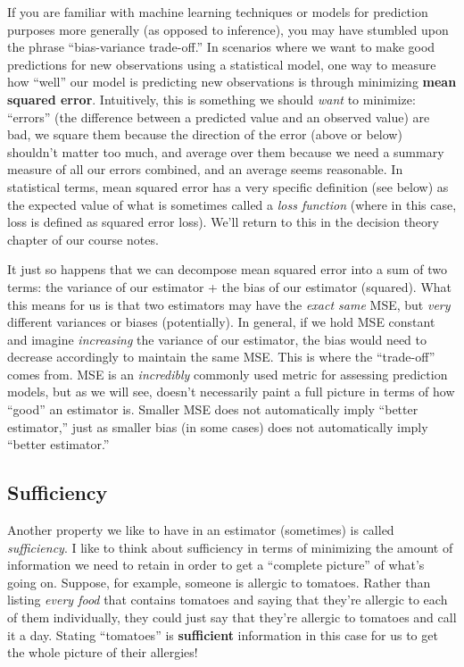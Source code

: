 \documentclass[
  letterpaper,
  DIV=11,
  numbers=noendperiod]{scrreprt}
\begin{document}
If you are familiar with machine learning techniques or models for
prediction purposes more generally (as opposed to inference), you may
have stumbled upon the phrase ``bias-variance trade-off.'' In scenarios
where we want to make good predictions for new observations using a
statistical model, one way to measure how ``well'' our model is
predicting new observations is through minimizing \textbf{mean squared
error}. Intuitively, this is something we should \emph{want} to
minimize: ``errors'' (the difference between a predicted value and an
observed value) are bad, we square them because the direction of the
error (above or below) shouldn't matter too much, and average over them
because we need a summary measure of all our errors combined, and an
average seems reasonable. In statistical terms, mean squared error has a
very specific definition (see below) as the expected value of what is
sometimes called a \emph{loss function} (where in this case, loss is
defined as squared error loss). We'll return to this in the decision
theory chapter of our course notes.

It just so happens that we can decompose mean squared error into a sum
of two terms: the variance of our estimator + the bias of our estimator
(squared). What this means for us is that two estimators may have the
\emph{exact same} MSE, but \emph{very} different variances or biases
(potentially). In general, if we hold MSE constant and imagine
\emph{increasing} the variance of our estimator, the bias would need to
decrease accordingly to maintain the same MSE. This is where the
``trade-off'' comes from. MSE is an \emph{incredibly} commonly used
metric for assessing prediction models, but as we will see, doesn't
necessarily paint a full picture in terms of how ``good'' an estimator
is. Smaller MSE does not automatically imply ``better estimator,'' just
as smaller bias (in some cases) does not automatically imply ``better
estimator.''

\subsection*{Sufficiency}\label{sufficiency}

Another property we like to have in an estimator (sometimes) is called
\emph{sufficiency}. I like to think about sufficiency in terms of
minimizing the amount of information we need to retain in order to get a
``complete picture'' of what's going on. Suppose, for example, someone
is allergic to tomatoes. Rather than listing \emph{every food} that
contains tomatoes and saying that they're allergic to each of them
individually, they could just say that they're allergic to tomatoes and
call it a day. Stating ``tomatoes'' is \textbf{sufficient} information
in this case for us to get the whole picture of their allergies!
\end{document}
